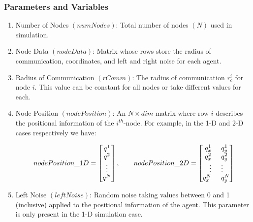 \documentclass[../CourseManual.tex]{subfiles}
\begin{document}
\subsubsection{Parameters and Variables}
\renewcommand{\labelenumi}{\roman{enumi}}
\begin{enumerate}

    \item Number of Nodes $(numNodes)$: Total number of nodes $(N)$ used in simulation.
    
    \item Node Data $(nodeData)$: Matrix whose rows store the radius of communication, coordinates, and left and right noise for each agent. 
    
    \item Radius of Communication $(rComm)$: The radius of communication $r^{i}_c$ for node $i$. This value can be constant for all nodes or take different values for each.  
  
    \item Node Position $(nodePosition)$: An $N \times dim$ matrix where row $i$ describes the positional information of the $i^{th}$-node. For example, in the 1-D and 2-D cases respectively we have: 
    
    $$nodePosition\_1D = 
    \begin{bmatrix}
    q^{1}\\
    q^{2}\\
    \vdots\\
    q^{N}\\
    \end{bmatrix}, \qquad
    nodePosition\_2D = 
    \begin{bmatrix}
    q^{1}_{x} \hspace{0.5cm} q^{1}_{y}\\
    q^{2}_{x} \hspace{0.5cm} q^{2}_{y}\\
    \vdots \hspace{0.5cm} \vdots \\
    q^{N}_{x} \hspace{0.5cm} q^{N}_{y}\\
    \end{bmatrix}$$
    
    \item Left Noise $(leftNoise)$: Random noise taking values between 0 and 1 (inclusive) applied to the positional information of the agent.  This parameter is only present in the 1-D simulation case. 
    

\end{enumerate}
\end{document}
